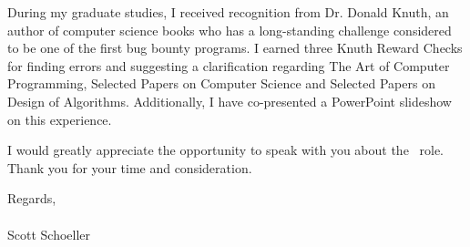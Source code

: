 \documentclass[10pt]{letter}
\begin{document}
\begin{letter}{}
\begin{flushleft}
\par{During my graduate studies, I received recognition from Dr. Donald Knuth, an author of computer science books who has a long-standing challenge considered to be one of the first bug bounty programs. I earned three Knuth Reward Checks for finding errors and suggesting a clarification regarding The Art of Computer Programming, Selected Papers on Computer Science and Selected Papers on Design of Algorithms. Additionally, I have co-presented a PowerPoint slideshow on this experience.
}


\par{
I would greatly appreciate the opportunity to speak with you about the \Postitle \ role. Thank you for your time and consideration.
}

Regards,\\
\ \\
Scott Schoeller\\
\end{flushleft}

\end{letter}
\end{document}
